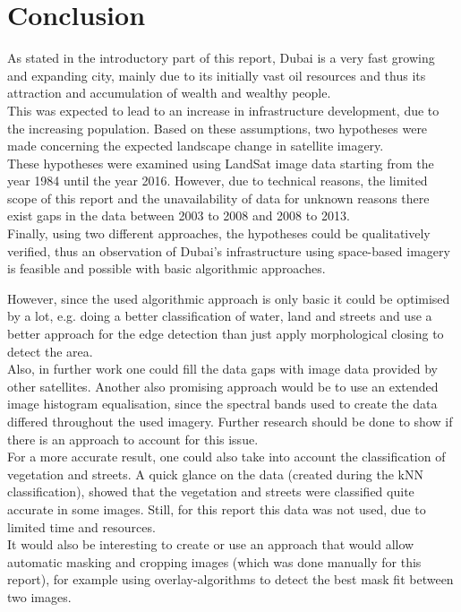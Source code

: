 \section{Conclusion}

As stated in the introductory part of this report, Dubai is a very fast growing and expanding city, mainly due to its initially vast oil resources and thus its attraction and accumulation of wealth and wealthy people.\\
This was expected to lead to an increase in infrastructure development, due to the increasing population. Based on these assumptions, two hypotheses were made concerning the expected landscape change in satellite imagery.\\
These hypotheses were examined using LandSat image data starting from the year 1984 until the year 2016. However, due to technical reasons, the limited scope of this report and the unavailability of data for unknown reasons there exist gaps in the data between 2003 to 2008 and 2008 to 2013.\\
Finally, using two different approaches, the hypotheses could be qualitatively verified, thus an observation of Dubai's infrastructure using space-based imagery is feasible and possible with basic algorithmic approaches.

However, since the used algorithmic approach is only basic it could be optimised by a lot, e.g. doing a better classification of water, land and streets and use a better approach for the edge detection than just apply morphological closing to detect the area.\\
Also, in further work one could fill the data gaps with image data provided by other satellites. Another also promising approach would be to use an extended image histogram equalisation, since the spectral bands used to create the data differed throughout the used imagery. Further research should be done to show if there is an approach to account for this issue.\\
For a more accurate result, one could also take into account the classification of vegetation and streets. A quick glance on the data (created during the kNN classification), showed that the vegetation and streets were classified quite accurate in some images. Still, for this report this data was not used, due to limited time and resources.\\
It would also be interesting to create or use an approach that would allow automatic masking and cropping images (which was done manually for this report), for example using overlay-algorithms to detect the best mask fit between two images.

